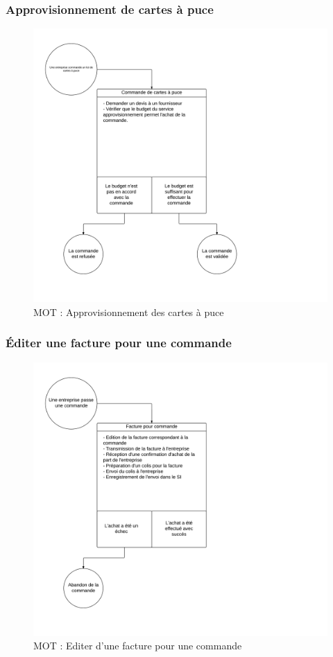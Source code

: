 \subsubsection{Approvisionnement de cartes à puce}
\begin{figure}[ht]
    \centering
    \includegraphics[width=\textwidth]{mot-approvisionnement-cartes-a-puce}
    \caption{MOT : Approvisionnement des cartes à puce}
    \label{fig:mot-approvisionnement-cartes-a-puce}
\end{figure}

\subsubsection{Éditer une facture pour une commande}
\begin{figure}[ht]
    \centering
    \includegraphics[width=\textwidth]{mot-editer-facture-commande}
    \caption{MOT : Editer d'une facture pour une commande}
    \label{fig:mot-editer-facture-commande}
\end{figure}

